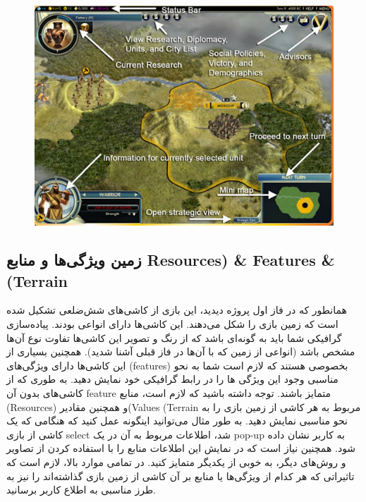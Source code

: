 \documentclass[]{article}
\begin{document}
\begin{figure}[H]
    \centerline{\includegraphics[scale=0.8]{resources/infopanel.jpg}}
\end{figure}



\subsection*{{\titr زمین ویژگی‌ها و منابع Resources) & Features & (Terrain}}

همانطور که در فاز اول پروژه دیدید، این بازی از کاشی‌های شش‌ضلعی تشکیل شده‌ است که زمین بازی را شکل می‌دهند. این کاشی‌ها دارای انواعی بودند. پیاده‌سازی گرافیکی شما باید به گونه‌ای باشد که از رنگ و تصویر این کاشی‌ها تفاوت نوع آن‌ها مشخص باشد (انواعی از زمین که با آن‌ها در فاز قبلی آشنا شدید).
همچنین بسیاری از این کاشی‌ها دارای ویژگی‌های (features) بخصوصی هستند که لازم است شما به نحو مناسبی وجود  این ویژگی ها را در رابط گرافیکی خود نمایش دهید. به طوری که از کاشی‌های بدون آن feature متمایز باشند.
توجه داشته باشید که لازم است، منابع (Resources) و همچنین مقادیر(Values (Terrain مربوط به هر کاشی از زمین بازی را به نحو مناسبی نمایش دهید. به طور مثال می‌توانید اینگونه عمل کنید که هنگامی که یک کاشی از بازی select شد، اطلاعات مربوط به  آن در یک pop-up به کاربر نشان داده شود. همچنین نیاز است که در نمایش این اطلاعات منابع را با استفاده کردن از تصاویر و روش‌های دیگر، به خوبی از یکدیگر متمایز کنید.
در تمامی موارد بالا، لازم است که تاثیراتی که هر کدام از ویژگی‌ها یا منابع بر آن کاشی از زمین بازی گذاشته‌اند را نیز به طرز مناسبی به اطلاع کاربر برسانید.
\end{document}
